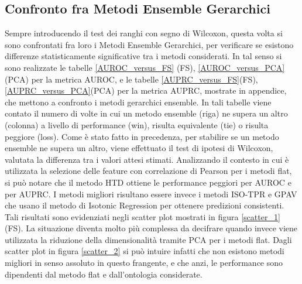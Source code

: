 \documentclass[12pt]{report}
\begin{document}
\subsection{Confronto fra Metodi Ensemble Gerarchici}

Sempre introducendo il test dei ranghi con segno di Wilcoxon, questa volta si sono confrontati fra loro i Metodi Ensemble Gerarchici, per verificare se esistono differenze statisticamente significative tra i metodi considerati.
\newline
\newline
In tal senso si sono realizzate le tabelle \ref{AUROC_versus_FS} (FS), \ref{AUROC_versus_PCA}(PCA) per la metrica AUROC, e le tabelle \ref{AUPRC_versus_FS}(FS), \ref{AUPRC_versus_PCA}(PCA) per la metrica AUPRC, mostrate in appendice, che mettono a confronto i metodi gerarchici ensemble. In tali tabelle viene contato il numero di volte in cui un metodo ensemble (riga) ne supera un altro (colonna) a livello di performance (win), risulta equivalente (tie) o risulta peggiore (loss). Come è stato fatto in precedenza, per stabilire se un metodo ensemble ne supera un altro, viene effettuato il test di ipotesi di Wilcoxon, valutata la differenza tra i valori attesi stimati. Analizzando il contesto in cui è utilizzata la selezione delle feature con correlazione di Pearson per i metodi flat, si può notare che  il metodo HTD ottiene le performance peggiori  per AUROC e per AUPRC. I metodi migliori risultano essere invece i metodi ISO-TPR e GPAV che usano il metodo di Isotonic Regression per ottenere predizioni consistenti. Tali risultati sono evidenziati negli scatter plot mostrati in figura
\ref{scatter_1} (FS). 
\newline
\newline
La situazione diventa molto più complessa da decifrare quando invece viene utilizzata la riduzione della dimensionalità tramite PCA per i metodi flat. Dagli scatter plot in figura \ref{scatter_2} si può intuire infatti che non esistono metodi migliori in senso assoluto in questo frangente, e che anzi, le performance sono dipendenti dal metodo flat e dall'ontologia considerate.
\end{document}
